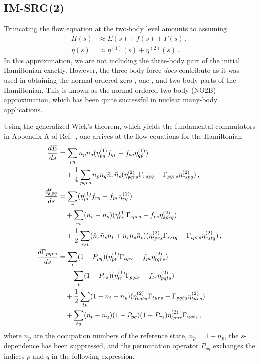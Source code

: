 \subsection{IM-SRG(2)}

Truncating the flow equation at the two-body level amounts to assuming
\begin{align}
  H(s) &\approx E(s) + f(s) + \Gamma(s)\,,\\
  \eta(s) &\approx \eta^{(1)}(s) + \eta^{(2)}(s)\,.
\end{align}
In this approximation,
we are not including the three-body part of the initial Hamiltonian exactly.
However, the three-body force \textit{does} contribute
as it was used in obtaining the normal-ordered zero-, one-, and two-body parts
of the Hamiltonian.
This is known as the normal-ordered two-body (NO2B) approximation,
which has been quite successful in nuclear many-body applications.

Using the generalized Wick's theorem,
which yields the fundamental commutators in Appendix A of Ref.~\cite{Herg15imsrgphysrep},
one arrives at the flow equations for the Hamiltonian
\begin{align}
  \phantom{\frac{d\Gamma_{pqrs}}{ds}}
  &\begin{aligned}
    \mathllap{\frac{dE}{ds}} &= \sum_{pq} n_{p} \bar{n}_{q}
    (\genone_{pq} f_{qp} - f_{pq} \genone_{qp})\\
    &\quad + \frac{1}{4} \sum_{pqrs} n_{p}n_{q}\bar{n}_r \bar{n}_s
    (\gentwo_{pqrs} \Gamma_{rspq} - \Gamma_{pqrs}\gentwo_{rspq})\,,
  \end{aligned}\label{eq:imsrg2_0body}\\
  &\begin{aligned}
    \mathllap{\frac{df_{pq}}{ds}} &=
    \sum_{r}(\genone_{pr} f_{rq} - f_{pr} \genone_{rq}) \\
    &\quad+\sum_{rs}(n_r - n_s)(\genone_{rs}\Gamma_{sprq} - f_{rs}\gentwo_{sprq}) \\
    &\quad+\frac{1}{2}\sum_{rst}(\bar{n}_r \bar{n}_s n_t + n_r n_s \bar{n}_t)
    (\gentwo_{tprs} \Gamma_{rstq} - \Gamma_{tprs} \gentwo_{rstq})\,,
  \end{aligned}\\
  &\begin{aligned}
    \mathllap{\frac{d\Gamma_{pqrs}}{ds}} &=
    \sum_{t}(1 - P_{pq})(\genone_{pt}\Gamma_{tqrs} - f_{pt}\gentwo_{tqrs}) \\
    &\quad - \sum_{t}(1 - P_{rs})(\genone_{tr}\Gamma_{pqts} - f_{tr}\gentwo_{pqts}) \\
    &\quad + \frac{1}{2}\sum_{tu}(1 - n_{t} - n_{u})(\gentwo_{pqtu}\Gamma_{turs} - \Gamma_{pqtu}\gentwo_{turs}) \\
    &\quad + \sum_{tu} (n_t - n_u)(1 - P_{pq})(1 - P_{rs})\gentwo_{tpur}\Gamma_{uqts}\,,
  \end{aligned}\label{eq:imsrg2_2body}
\end{align}
where $n_p$ are the occupation numbers of the reference state,
$\bar{n}_p = 1 - n_p$,
the $s$-dependence has been suppressed,
and the permutation operator $P_{pq}$ exchanges the indices $p$ and $q$
in the following expression.

